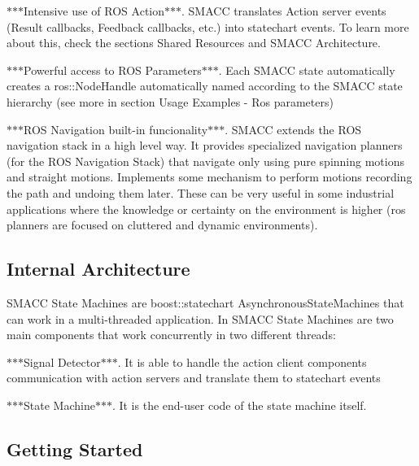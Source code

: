 \begin{DoxyItemize}
\item $\ast$$\ast$$\ast$\+Intensive use of R\+OS Action$\ast$$\ast$$\ast$. S\+M\+A\+CC translates Action server events (Result callbacks, Feedback callbacks, etc.) into statechart events. To learn more about this, check the sections Shared Resources and S\+M\+A\+CC Architecture.
\item $\ast$$\ast$$\ast$\+Powerful access to R\+OS Parameters$\ast$$\ast$$\ast$. Each S\+M\+A\+CC state automatically creates a ros\+::\+Node\+Handle automatically named according to the S\+M\+A\+CC state hierarchy (see more in section Usage Examples -\/ Ros parameters)
\item $\ast$$\ast$$\ast$\+R\+OS Navigation built-\/in funcionality$\ast$$\ast$$\ast$. S\+M\+A\+CC extends the R\+OS navigation stack in a high level way. It provides specialized navigation planners (for the R\+OS Navigation Stack) that navigate only using pure spinning motions and straight motions. Implements some mechanism to perform motions recording the path and undoing them later. These can be very useful in some industrial applications where the knowledge or certainty on the environment is higher (ros planners are focused on cluttered and dynamic environments).
\end{DoxyItemize}

\subsection*{Internal Architecture}

S\+M\+A\+CC State Machines are boost\+::statechart Asynchronous\+State\+Machines that can work in a multi-\/threaded application. In S\+M\+A\+CC State Machines are two main components that work concurrently in two different threads\+:


\begin{DoxyItemize}
\item $\ast$$\ast$$\ast$\+Signal Detector$\ast$$\ast$$\ast$. It is able to handle the action client components communication with action servers and translate them to statechart events
\item $\ast$$\ast$$\ast$\+State Machine$\ast$$\ast$$\ast$. It is the end-\/user code of the state machine itself.
\end{DoxyItemize}

 

\subsection*{Getting Started}

